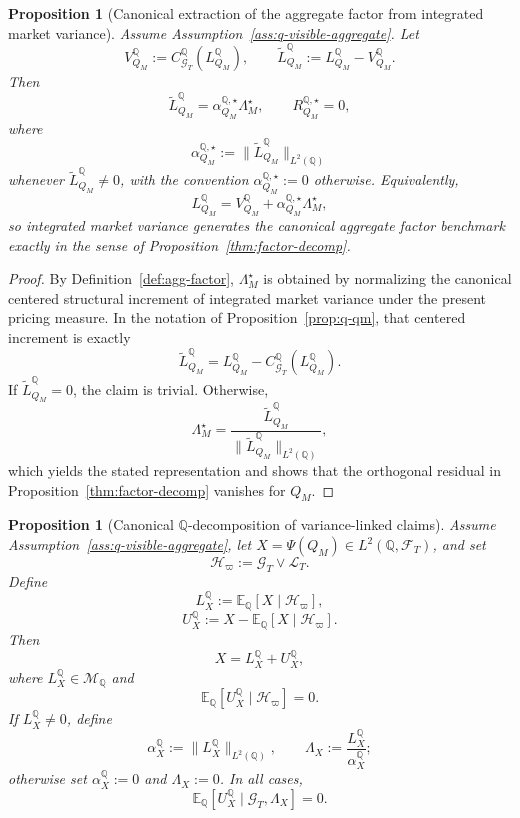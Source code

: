 \documentclass[11pt,a4paper]{amsart}
\theoremstyle{plain}
\newtheorem{proposition}[theorem]{Proposition}
\theoremstyle{definition}
\theoremstyle{remark}
\newcommand{\QQ}{\mathbb{Q}}
\newcommand{\EE}{\mathbb{E}}
\newcommand{\cF}{\mathcal{F}}
\newcommand{\cG}{\mathcal{G}}
\newcommand{\cH}{\mathcal{H}}
\newcommand{\cL}{\mathcal{L}}
\newcommand{\cM}{\mathcal{M}}
\begin{document}
\begin{proposition}[Canonical extraction of the aggregate factor from integrated market variance]\label{prop:q-qm-factor}
Assume Assumption~\ref{ass:q-visible-aggregate}.  Let
\[
        V_{Q_M}^\QQ:=C_{\cG_T}^\QQ(L_{Q_M}^\QQ),
        \qquad
        \widetilde L_{Q_M}^\QQ:=L_{Q_M}^\QQ-V_{Q_M}^\QQ.
\]
Then
\[
        \widetilde L_{Q_M}^\QQ
        =
        \alpha_{Q_M}^{\QQ,\star}\Lambda_M^\star,
        \qquad
        R_{Q_M}^{\QQ,\star}=0,
\]
where
\[
        \alpha_{Q_M}^{\QQ,\star}
        :=
        \|\widetilde L_{Q_M}^\QQ\|_{L^2(\QQ)}
\]
whenever \(\widetilde L_{Q_M}^\QQ\neq0\), with the convention
\(\alpha_{Q_M}^{\QQ,\star}:=0\) otherwise.  Equivalently,
\[
        L_{Q_M}^\QQ
        =
        V_{Q_M}^\QQ+\alpha_{Q_M}^{\QQ,\star}\Lambda_M^\star,
\]
so integrated market variance generates the canonical aggregate factor benchmark exactly in the
sense of Proposition~\ref{thm:factor-decomp}.
\end{proposition}

\begin{proof}
By Definition~\ref{def:agg-factor}, \(\Lambda_M^\star\) is obtained by normalizing the canonical
centered structural increment of integrated market variance under the present pricing measure.  In
the notation of Proposition~\ref{prop:q-qm}, that centered increment is exactly
\[
        \widetilde L_{Q_M}^\QQ
        =
        L_{Q_M}^\QQ-C_{\cG_T}^\QQ(L_{Q_M}^\QQ).
\]
If \(\widetilde L_{Q_M}^\QQ=0\), the claim is trivial.  Otherwise,
\[
        \Lambda_M^\star
        =
        \frac{\widetilde L_{Q_M}^\QQ}{\|\widetilde L_{Q_M}^\QQ\|_{L^2(\QQ)}},
\]
which yields the stated representation and shows that the orthogonal residual in
Proposition~\ref{thm:factor-decomp} vanishes for \(Q_M\).
\end{proof}

\begin{proposition}[Canonical \(\QQ\)-decomposition of variance-linked claims]\label{prop:q-claim}
Assume Assumption~\ref{ass:q-visible-aggregate}, let \(X=\Psi(Q_M)\in L^2(\QQ,\cF_T)\), and set
\[
        \cH_\varpi:=\cG_T\vee \cL_T.
\]
Define
\[
        L_X^\QQ:=\EE_\QQ[X\mid \cH_\varpi],
\]
\[
        U_X^\QQ:=X-\EE_\QQ[X\mid \cH_\varpi].
\]
Then
\[
        X=L_X^\QQ+U_X^\QQ,
\]
where \(L_X^\QQ\in \cM_\QQ\) and
\[
        \EE_\QQ[U_X^\QQ\mid \cH_\varpi]=0.
\]
If \(L_X^\QQ\neq0\), define
\[
        \alpha_X^\QQ:=\|L_X^\QQ\|_{L^2(\QQ)},
        \qquad
        \Lambda_X:=\frac{L_X^\QQ}{\alpha_X^\QQ};
\]
otherwise set \(\alpha_X^\QQ:=0\) and \(\Lambda_X:=0\).  In all cases,
\[
        \EE_\QQ[U_X^\QQ\mid \cG_T,\Lambda_X]=0.
\]
\end{proposition}
\end{document}
